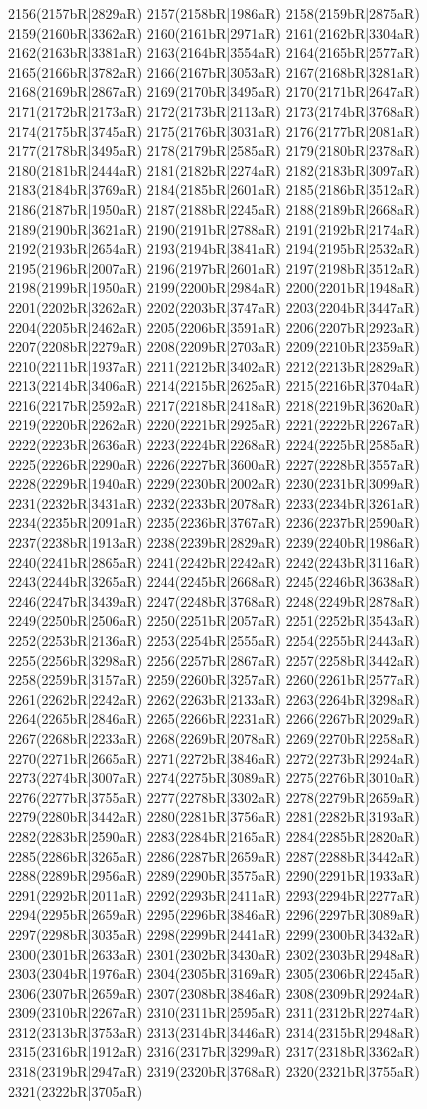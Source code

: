 2156(2157bR|2829aR) 2157(2158bR|1986aR) 2158(2159bR|2875aR) 2159(2160bR|3362aR) 2160(2161bR|2971aR) 2161(2162bR|3304aR) 2162(2163bR|3381aR) 2163(2164bR|3554aR) 2164(2165bR|2577aR) 2165(2166bR|3782aR) 2166(2167bR|3053aR) 2167(2168bR|3281aR) 2168(2169bR|2867aR) 2169(2170bR|3495aR) 2170(2171bR|2647aR) 2171(2172bR|2173aR) 2172(2173bR|2113aR) 2173(2174bR|3768aR) 2174(2175bR|3745aR) 2175(2176bR|3031aR) 2176(2177bR|2081aR) 2177(2178bR|3495aR) 2178(2179bR|2585aR) 2179(2180bR|2378aR) 2180(2181bR|2444aR) 2181(2182bR|2274aR) 2182(2183bR|3097aR) 2183(2184bR|3769aR) 2184(2185bR|2601aR) 2185(2186bR|3512aR) 2186(2187bR|1950aR) 2187(2188bR|2245aR) 2188(2189bR|2668aR) 2189(2190bR|3621aR) 2190(2191bR|2788aR) 2191(2192bR|2174aR) 2192(2193bR|2654aR) 2193(2194bR|3841aR) 2194(2195bR|2532aR) 2195(2196bR|2007aR) 2196(2197bR|2601aR) 2197(2198bR|3512aR) 2198(2199bR|1950aR) 2199(2200bR|2984aR) 2200(2201bR|1948aR) 2201(2202bR|3262aR) 2202(2203bR|3747aR) 2203(2204bR|3447aR) 2204(2205bR|2462aR) 2205(2206bR|3591aR) 2206(2207bR|2923aR) 2207(2208bR|2279aR) 2208(2209bR|2703aR) 2209(2210bR|2359aR) 2210(2211bR|1937aR) 2211(2212bR|3402aR) 2212(2213bR|2829aR) 2213(2214bR|3406aR) 2214(2215bR|2625aR) 2215(2216bR|3704aR) 2216(2217bR|2592aR) 2217(2218bR|2418aR) 2218(2219bR|3620aR) 2219(2220bR|2262aR) 2220(2221bR|2925aR) 2221(2222bR|2267aR) 2222(2223bR|2636aR) 2223(2224bR|2268aR) 2224(2225bR|2585aR) 2225(2226bR|2290aR) 2226(2227bR|3600aR) 2227(2228bR|3557aR) 2228(2229bR|1940aR) 2229(2230bR|2002aR) 2230(2231bR|3099aR) 2231(2232bR|3431aR) 2232(2233bR|2078aR) 2233(2234bR|3261aR) 2234(2235bR|2091aR) 2235(2236bR|3767aR) 2236(2237bR|2590aR) 2237(2238bR|1913aR) 2238(2239bR|2829aR) 2239(2240bR|1986aR) 2240(2241bR|2865aR) 2241(2242bR|2242aR) 2242(2243bR|3116aR) 2243(2244bR|3265aR) 2244(2245bR|2668aR) 2245(2246bR|3638aR) 2246(2247bR|3439aR) 2247(2248bR|3768aR) 2248(2249bR|2878aR) 2249(2250bR|2506aR) 2250(2251bR|2057aR) 2251(2252bR|3543aR) 2252(2253bR|2136aR) 2253(2254bR|2555aR) 2254(2255bR|2443aR) 2255(2256bR|3298aR) 2256(2257bR|2867aR) 2257(2258bR|3442aR) 2258(2259bR|3157aR) 2259(2260bR|3257aR) 2260(2261bR|2577aR) 2261(2262bR|2242aR) 2262(2263bR|2133aR) 2263(2264bR|3298aR) 2264(2265bR|2846aR) 2265(2266bR|2231aR) 2266(2267bR|2029aR) 2267(2268bR|2233aR) 2268(2269bR|2078aR) 2269(2270bR|2258aR) 2270(2271bR|2665aR) 2271(2272bR|3846aR) 2272(2273bR|2924aR) 2273(2274bR|3007aR) 2274(2275bR|3089aR) 2275(2276bR|3010aR) 2276(2277bR|3755aR) 2277(2278bR|3302aR) 2278(2279bR|2659aR) 2279(2280bR|3442aR) 2280(2281bR|3756aR) 2281(2282bR|3193aR) 2282(2283bR|2590aR) 2283(2284bR|2165aR) 2284(2285bR|2820aR) 2285(2286bR|3265aR) 2286(2287bR|2659aR) 2287(2288bR|3442aR) 2288(2289bR|2956aR) 2289(2290bR|3575aR) 2290(2291bR|1933aR) 2291(2292bR|2011aR) 2292(2293bR|2411aR) 2293(2294bR|2277aR) 2294(2295bR|2659aR) 2295(2296bR|3846aR) 2296(2297bR|3089aR) 2297(2298bR|3035aR) 2298(2299bR|2441aR) 2299(2300bR|3432aR) 2300(2301bR|2633aR) 2301(2302bR|3430aR) 2302(2303bR|2948aR) 2303(2304bR|1976aR) 2304(2305bR|3169aR) 2305(2306bR|2245aR) 2306(2307bR|2659aR) 2307(2308bR|3846aR) 2308(2309bR|2924aR) 2309(2310bR|2267aR) 2310(2311bR|2595aR) 2311(2312bR|2274aR) 2312(2313bR|3753aR) 2313(2314bR|3446aR) 2314(2315bR|2948aR) 2315(2316bR|1912aR) 2316(2317bR|3299aR) 2317(2318bR|3362aR) 2318(2319bR|2947aR) 2319(2320bR|3768aR) 2320(2321bR|3755aR) 2321(2322bR|3705aR) 